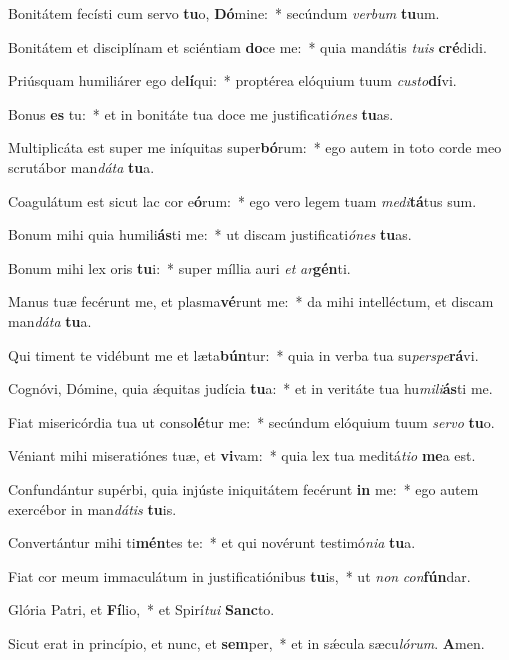 ﻿\item Bonitátem fecísti cum servo \textbf{tu}o, \textbf{Dó}mine:~* secúndum \emph{ver}\emph{bum} \textbf{tu}um.
\item Bonitátem et disciplínam et sciéntiam \textbf{do}ce me:~* quia mandátis \emph{tu}\emph{is} \textbf{cré}didi.
\item Priúsquam humiliárer ego de\textbf{lí}qui:~* proptérea elóquium tuum \emph{cus}\emph{to}\textbf{dí}vi.
\item Bonus \textbf{es} tu:~* et in bonitáte tua doce me justificati\emph{ó}\emph{nes} \textbf{tu}as.
\item Multiplicáta est super me iníquitas super\textbf{bó}rum:~* ego autem in toto corde meo scrutábor man\emph{dá}\emph{ta} \textbf{tu}a.
\item Coagulátum est sicut lac cor e\textbf{ó}rum:~* ego vero legem tuam \emph{me}\emph{di}\textbf{tá}tus sum.
\item Bonum mihi quia humili\textbf{ás}ti me:~* ut discam justificati\emph{ó}\emph{nes} \textbf{tu}as.
\item Bonum mihi lex oris \textbf{tu}i:~* super míllia auri \emph{et} \emph{ar}\textbf{gén}ti.
\item Manus tuæ fecérunt me, et plasma\textbf{vé}runt me:~* da mihi intelléctum, et discam man\emph{dá}\emph{ta} \textbf{tu}a.
\item Qui timent te vidébunt me et læta\textbf{bún}tur:~* quia in verba tua su\emph{per}\emph{spe}\textbf{rá}vi.
\item Cognóvi, Dómine, quia ǽquitas judícia \textbf{tu}a:~* et in veritáte tua hu\emph{mi}\emph{li}\textbf{ás}ti me.
\item Fiat misericórdia tua ut conso\textbf{lé}tur me:~* secúndum elóquium tuum \emph{ser}\emph{vo} \textbf{tu}o.
\item Véniant mihi miseratiónes tuæ, et \textbf{vi}vam:~* quia lex tua meditá\emph{ti}\emph{o} \textbf{me}a est.
\item Confundántur supérbi, quia injúste iniquitátem fecérunt \textbf{in} me:~* ego autem exercébor in man\emph{dá}\emph{tis} \textbf{tu}is.
\item Convertántur mihi ti\textbf{mén}tes te:~* et qui novérunt testimó\emph{ni}\emph{a} \textbf{tu}a.
\item Fiat cor meum immaculátum in justificatiónibus \textbf{tu}is,~* ut \emph{non} \emph{con}\textbf{fún}dar.
\item Glória Patri, et \textbf{Fí}lio,~* et Spirí\emph{tu}\emph{i} \textbf{Sanc}to.
\item Sicut erat in princípio, et nunc, et \textbf{sem}per,~* et in sǽcula sæcu\emph{ló}\emph{rum}. \textbf{A}men.